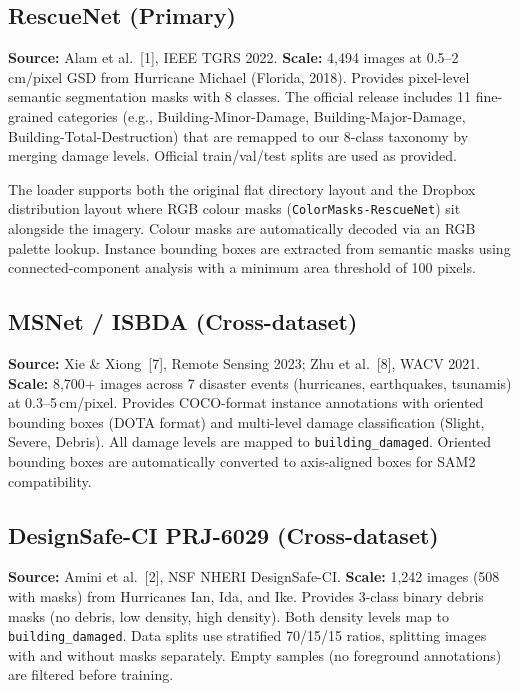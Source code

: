 \documentclass[10pt,a4paper,twocolumn]{article}
\begin{document}
\subsection{RescueNet (Primary)}

\textbf{Source:} Alam et al.~[1], IEEE TGRS 2022. \textbf{Scale:} 4,494 images at 0.5--2\,cm/pixel GSD from Hurricane Michael (Florida, 2018). Provides pixel-level semantic segmentation masks with 8 classes. The official release includes 11 fine-grained categories (e.g., Building-Minor-Damage, Building-Major-Damage, Building-Total-Destruction) that are remapped to our 8-class taxonomy by merging damage levels. Official train/val/test splits are used as provided.

The loader supports both the original flat directory layout and the Dropbox distribution layout where RGB colour masks (\texttt{ColorMasks-RescueNet}) sit alongside the imagery. Colour masks are automatically decoded via an RGB palette lookup. Instance bounding boxes are extracted from semantic masks using connected-component analysis with a minimum area threshold of 100 pixels.

\subsection{MSNet / ISBDA (Cross-dataset)}

\textbf{Source:} Xie \& Xiong~[7], Remote Sensing 2023; Zhu et al.~[8], WACV 2021. \textbf{Scale:} 8,700+ images across 7 disaster events (hurricanes, earthquakes, tsunamis) at 0.3--5\,cm/pixel. Provides COCO-format instance annotations with oriented bounding boxes (DOTA format) and multi-level damage classification (Slight, Severe, Debris). All damage levels are mapped to \texttt{building\_damaged}. Oriented bounding boxes are automatically converted to axis-aligned boxes for SAM2 compatibility.

\subsection{DesignSafe-CI PRJ-6029 (Cross-dataset)}

\textbf{Source:} Amini et al.~[2], NSF NHERI DesignSafe-CI. \textbf{Scale:} 1,242 images (508 with masks) from Hurricanes Ian, Ida, and Ike. Provides 3-class binary debris masks (no debris, low density, high density). Both density levels map to \texttt{building\_damaged}. Data splits use stratified 70/15/15 ratios, splitting images with and without masks separately. Empty samples (no foreground annotations) are filtered before training.
\end{document}
